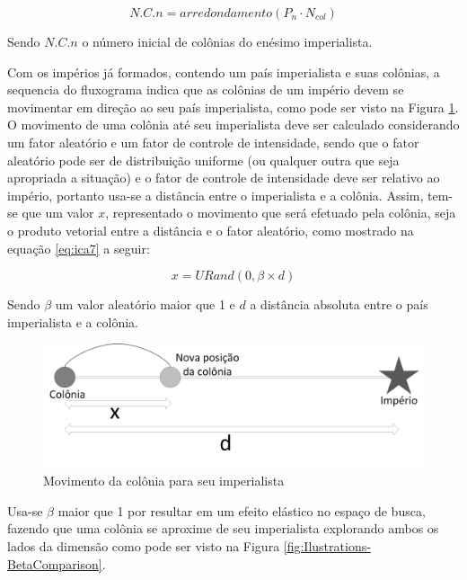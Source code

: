 \begin{equation}
\label{eq:ica6}
N.C.n = arredondamento ( P_{n} \cdot N_{col})
\end{equation}

Sendo \(N.C.n\) o número inicial de colônias do enésimo imperialista.

Com os impérios já formados, contendo um país imperialista e suas colônias, a sequencia do fluxograma indica que as colônias de um império devem se movimentar em direção ao seu país imperialista, como pode ser visto na Figura \ref{fig:Ilustrations-ColonyEmpireMove}. O movimento de uma colônia até seu imperialista deve ser calculado considerando um fator aleatório e um fator de controle de intensidade, sendo que o fator aleatório pode ser de distribuição uniforme (ou qualquer outra que seja apropriada a situação) e  o fator de controle de intensidade deve ser relativo ao império, portanto usa-se a distância entre o imperialista e a colônia. Assim, tem-se que um valor \(x\), representado o movimento que será efetuado pela colônia, seja o produto vetorial entre a distância e o fator aleatório, como mostrado na equação \ref{eq:ica7} a seguir:

\begin{equation}
\label{eq:ica7}
x  = URand(0, \beta \times d)
\end{equation}

Sendo \(\beta\) um valor aleatório maior que 1 e \(d\) a distância absoluta entre o país imperialista e a colônia.

\begin{figure}[h]
	\centering	
	\includegraphics[scale=0.5]{Figuras/Ilustrations-ColonyEmpireMove.png}
	\caption{Movimento da colônia para seu imperialista}
	\label{fig:Ilustrations-ColonyEmpireMove}
\end{figure}

Usa-se \(\beta\) maior que 1 por resultar em um efeito elástico no espaço de busca, fazendo que uma colônia se aproxime de seu imperialista explorando ambos os lados da dimensão como pode ser visto na Figura \ref{fig:Ilustrations-BetaComparison}. 

